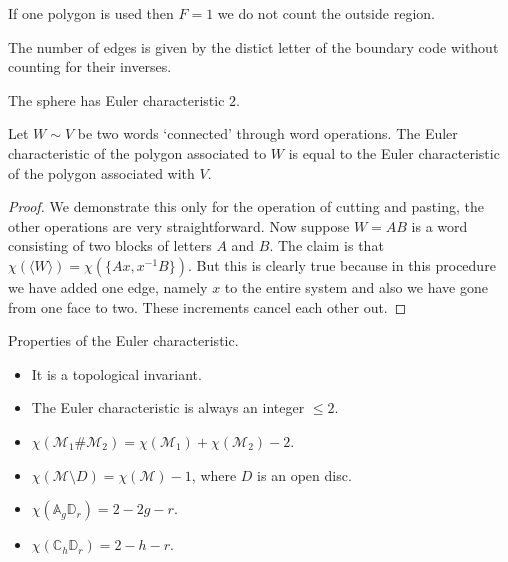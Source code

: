 \documentclass[12pt, a4paper]{article}
\begin{document}
\begin{mdremark}
    If one polygon is used then \(F=1\) we do not count the outside region.
\end{mdremark}

\begin{mdnote}
    The number of edges is given by the distict letter of the boundary code without counting for their inverses.
\end{mdnote}

\begin{mdexample}
    The sphere has Euler characteristic \(2\).
\end{mdexample}

\begin{proposition}
    Let \(W \sim V\) be two words `connected' through word operations. The Euler characteristic of the polygon associated to \(W\) is equal to the Euler characteristic of the polygon associated with \(V\). 
\end{proposition}

\begin{proof}
    We demonstrate this only for the operation of cutting and pasting, the other operations are very straightforward. Now suppose \( W = AB \) is a word consisting of two blocks of letters \( A \) and \( B \). The claim is that \( \chi(\langle W \rangle) = \chi(\{Ax, x^{-1}B\}) \). But this is clearly true because in this procedure we have added one edge, namely \( x \) to the entire system and also we have gone from one face to two. These increments cancel each other out.
\end{proof}

\begin{mdprop}
    Properties of the Euler characteristic.
    \begin{itemize}
        \item It is a topological invariant.
        \item The Euler characteristic is always an integer \(\leq 2\).
        \item \(\chi(\mathcal{M}_1 \#\mathcal{M}_2)=\chi(\mathcal{M}_1)+\chi(\mathcal{M}_2)-2\).
        \item \(\chi(\mathcal{M}\setminus D) =\chi(\mathcal{M})-1\), where \(D\) is an open disc.
        \item \(\chi(\mathbb{A}_g\mathbb{D}_r)=2-2g-r\).
        \item \(\chi(\mathbb{C}_h\mathbb{D}_r)=2-h-r\).
    \end{itemize}
\end{mdprop}
\end{document}
